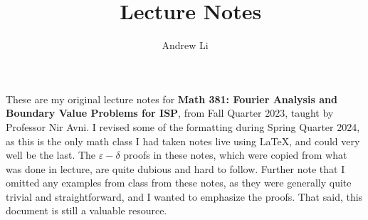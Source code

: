 \documentclass[12pt]{article}
\numberwithin{equation}{section}
\numberwithin{lemmacounter}{section}
\numberwithin{definitioncounter}{section}
\begin{document}
    
    \pagestyle{fancy}
    \fancyfoot[C]{}
    \fancyfoot[L]{\courseshort \: \coursetitle}
    \fancyfoot[R]{\thepage}

    \title{\textbf{\textsf{\courseshort \, Lecture Notes}}}
    \author{Andrew Li}
    \date{\term}
    \clearpage\maketitle
    \noindent These are my original lecture notes for \textbf{Math 381: Fourier Analysis and Boundary Value Problems for ISP}, from Fall Quarter 2023, taught by Professor Nir Avni. I revised some of the formatting during Spring Quarter 2024, as this is the only math class I had taken notes live using \LaTeX, and could very well be the last. The $\varepsilon-\delta$ proofs in these notes, which were copied from what was done in lecture, are quite dubious and hard to follow. Further note that I omitted any examples from class from these notes, as they were generally quite trivial and straightforward, and I wanted to emphasize the proofs. That said, this document is still a valuable resource.
    \thispagestyle{empty}

    \tableofcontents
    
    
    
    
    
    
    
    
    
    
    
    
    
    
    
    
    
    
    
    
    
    
    
    
    
    
\end{document}

